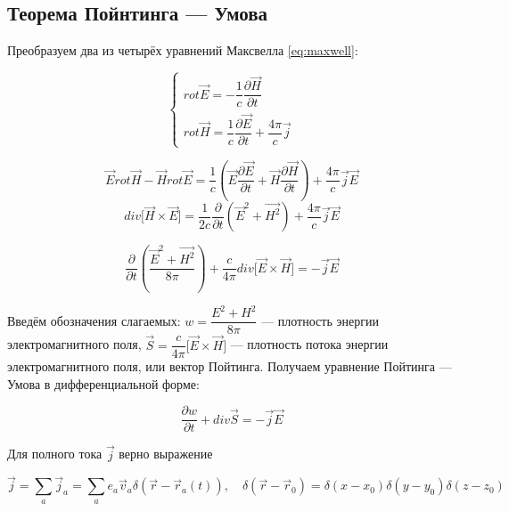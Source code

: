 \documentclass{article}
\begin{document}
\subsection{Теорема Пойнтинга --- Умова}

Преобразуем два из четырёх уравнений Максвелла \eqref{eq:maxwell}:

\begin{equation*}
    \begin{cases}
    rot\vec{E}=-\dfrac{1}{c}\dfrac{\partial\vec{H}}{\partial t}\\
    rot\vec{H}=\dfrac{1}{c}\dfrac{\partial\vec{E}}{\partial t}+\dfrac{4\pi}{c}\vec{j}
    \end{cases}
\end{equation*}

\begin{equation*}
    \vec{E}rot\vec{H}-\vec{H}rot\vec{E}=\frac{1}{c}\left(\vec{E}\frac{\partial\vec{E}}{\partial t}+\vec{H}\frac{\partial\vec{H}}{\partial t}\right)+\frac{4\pi}{c}\vec{j}\vec{E}
\end{equation*}
\begin{equation*}
    div\lbrack\vec{H}\times\vec{E}\rbrack=\frac{1}{2c}\frac{\partial}{\partial t}\left(\vec{E}^2+\vec{H^2}\right)+\frac{4\pi}{c}\vec{j}\vec{E}
\end{equation*}

\begin{equation}
    \frac{\partial}{\partial t}\left(\frac{\vec{E}^2+\vec{H^2}}{8\pi}\right)+\frac{c}{4\pi}div\lbrack\vec{E}\times\vec{H}\rbrack=-\vec{j}\vec{E}
\end{equation}

Введём обозначения слагаемых:  $w=\dfrac{E^2+H^2}{8\pi}$ --- плотность энергии электромагнитного поля, $\vec{S}=\dfrac{c}{4\pi}\lbrack\vec{E}\times\vec{H}\rbrack$ --- плотность потока энергии электромагнитного поля, или вектор Пойтинга. Получаем уравнение Пойтинга --- Умова в дифференциальной форме:

\begin{equation}\label{eq:pointing_diff}
    \frac{\partial w}{\partial t}+div\vec{S}=-\vec{j}\vec{E}
\end{equation}

Для полного тока $\vec{j}$ верно выражение 

\begin{equation*}
    \vec{j}=\sum_a\vec{j}_a=\sum_a e_a\vec{v}_a\delta\left(\vec{r}-\vec{r}_a\left(t\right)\right),\quad\delta\left(\vec{r}-\vec{r}_0\right)=\delta\left(x-x_0\right)\delta\left(y-y_0\right)\delta\left(z-z_0\right)
\end{equation*}
\end{document}
